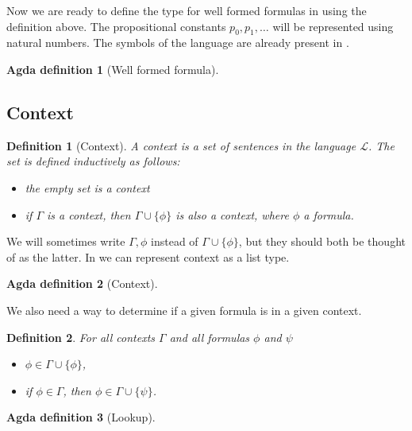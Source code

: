\documentclass[titlepage]{article}
\newtheorem{definition}{Definition}[section]
\newtheorem{agdadef}{Agda definition}
\begin{document}
Now we are ready to define the type for well formed formulas in \Agda using the definition above. The propositional constants $p_0, p_1, \hdots$ will be represented using natural numbers. The symbols of the language are already present in \Agda.
\begin{agdadef}[Well formed formula]$ $
\end{agdadef}





\subsection{Context}
\begin{definition}[Context]
    A context is a set of sentences in the language $\mathcal{L}$. The set is defined inductively as follows:
    \begin{itemize}
        \item the empty set is a context
        \item if $\Gamma$ is a context, then $\Gamma \cup \{\phi\}$ is also a context, where $\phi$ a formula.
    \end{itemize}
\end{definition}
We will sometimes write $\Gamma, \phi$ instead of $\Gamma \cup \{\phi\}$, but they should both be thought of as the latter. In \Agda we can represent context as a list type.

\begin{agdadef}[Context]$ $
\end{agdadef}
We also need a way to determine if a given formula is in a given context. 
\begin{definition}\label{lookup}
    For all contexts $\Gamma$ and all formulas $\phi$ and $\psi$
    \begin{itemize}
        \item $\phi \in \Gamma \cup \{\phi\}$,
        \item if $\phi \in \Gamma$, then $\phi \in \Gamma \cup \{\psi\}$.
    \end{itemize}
\end{definition}

\begin{agdadef}[Lookup]\label{agdaLookup}$ $
\end{agdadef}
\end{document}
